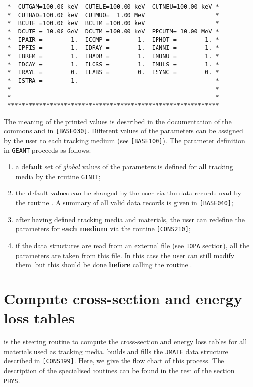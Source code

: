 \begin{verbatim}
 *  CUTGAM=100.00 keV  CUTELE=100.00 keV  CUTNEU=100.00 keV *
 *  CUTHAD=100.00 keV  CUTMUO=  1.00 MeV                    *
 *  BCUTE =100.00 keV  BCUTM =100.00 keV                    *
 *  DCUTE = 10.00 GeV  DCUTM =100.00 keV  PPCUTM= 10.00 MeV *
 *  IPAIR =        1.  ICOMP =        1.  IPHOT =        1. *
 *  IPFIS =        1.  IDRAY =        1.  IANNI =        1. *
 *  IBREM =        1.  IHADR =        1.  IMUNU =        1. *
 *  IDCAY =        1.  ILOSS =        1.  IMULS =        1. *
 *  IRAYL =        0.  ILABS =        0.  ISYNC =        0. *
 *  ISTRA =        1.                                       *
 *                                                          *
 *                                                          *
 ************************************************************
\end{verbatim}
The meaning of the printed values is described in the documentation of the
commons  and  in {\tt [BASE030]}.
Different values of the parameters can be assigned by the user to each
tracking medium (see {\tt [BASE100]}). The parameter definition in 
{\tt GEANT} proceeds as follows:
\begin{enumerate}
\item
a default set of {\it global} values of the parameters is defined for 
all tracking media by the routine {\tt GINIT};
\item
the default values can be changed by the user via the data records read 
by the routine . A summary of all valid data records is given 
in {\tt [BASE040]};
\item
after having defined tracking media and materials, the user can
redefine the parameters for
{\bf each medium} via the routine  {\tt [CONS210]};
\item
if the data structures are read from an external file
(see {\tt IOPA} section),
all the parameters are taken from this file. In this case the user can
still modify them, but this should be done {\bf before} calling the
routine .
\end{enumerate}
\section{Compute cross-section and energy loss tables}
 
 is the steering routine to compute the cross-section
and energy loss tables for all materials used as tracking media.
 builds and fills the {\tt JMATE} data structure described in
{\tt [CONS199]}. Here, we give the flow chart of this process.
The description of the specialised routines can be found in the
rest of the section {\tt PHYS}.
 
